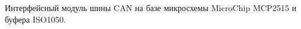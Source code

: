 \secdown


Интерфейсный модуль шины CAN на базе микросхемы MicroChip MCP2515
и буфера ISO1050. 

\secup
